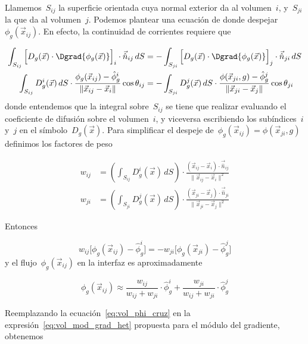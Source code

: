 Llamemos~$S_{ij}$ la superficie orientada cuya normal exterior da al volumen~$i$, y~$S_{ji}$ la que da al volumen~$j$. Podemos plantear una ecuación de donde despejar~$\phi_g(\vec{x}_{ij})$. En efecto, la continuidad de corrientes requiere que

\begin{align*}
 \int_{S_{ij}} \Big[ D_g(\vec{x}) \cdot \Dgrad{ \phi_g(\vec{x})} \Big]_i \cdot \vec{\hat{n}}_{ij} \, dS
&=
 - \int_{S_{ji}} \Big[ D_g(\vec{x}) \cdot \Dgrad{\phi_g(\vec{x})} \Big]_j \cdot \vec{\hat{n}}_{ji} \, dS
\\
\int_{S_{ij}} D_g^i(\vec{x}) \, dS \cdot \frac{\phi_g(\vec{x}_{ij}) - \hat{\phi}_g^i}{\| \vec{x}_{ij} - \vec{x}_i \|} \cos \theta_{ij}
&=
 - \int_{S_{ji}} D_g^j(\vec{x}) \, dS \cdot \frac{\phi(\vec{x}_{ji},g) - \hat{\phi}_g^j}{\| \vec{x}_{ji} - \vec{x}_j \|} \cos \theta_{ji}
\end{align*}
%
donde entendemos que la integral sobre~$S_{ij}$ se tiene que realizar evaluando el coeficiente de difusión sobre el volumen~$i$, y viceversa escribiendo los subíndices~$i$ y~$j$ en el símbolo~$D_g(\vec{x})$. Para simplificar el despeje de~$\phi_g(\vec{x}_{ij})=\phi(\vec{x}_{ji},g)$ definimos los factores de peso

\begin{align}
 w_{ij} &= \left( \int_{S_{ij}} D_g^i(\vec{x}) \, dS \right) \cdot \frac{(\vec{x}_{ij} - \vec{x}_i) \cdot \vec{\hat{n}}_{ij}}{\| \vec{x}_{ij} - \vec{x}_i \|^2} \label{eq:vol-peso-het-ij}
\\
 w_{ji} &= \left( \int_{S_{ji}} D_g^j(\vec{x}) \, dS \right) \cdot \frac{(\vec{x}_{ji} - \vec{x}_j) \cdot \vec{\hat{n}}_{ji}}{\| \vec{x}_{ji} - \vec{x}_j \|^2} \label{eq:vol-peso-het-ji}
\end{align}

Entonces

\begin{equation*}
 w_{ij} \Big[ \phi_g(\vec{x}_{ij}) - \hat{\phi}_g^i \Big] = -w_{ji} \Big[ \phi_g(\vec{x}_{ji}) - \hat{\phi}_g^j \Big]
\end{equation*}
%
y el flujo~$\phi_g(\vec{x}_{ij})$ en la interfaz es aproximadamente

\begin{equation}\label{eq:vol_phi_cruz}
 \phi_g(\vec{x}_{ij}) \approx \frac{w_{ij}}{w_{ij} + w_{ji}} \cdot \hat{\phi}_g^i + \frac{w_{ji}}{w_{ij} + w_{ji}} \cdot \hat{\phi}_g^j
\end{equation}

Reemplazando la ecuación~\eqref{eq:vol_phi_cruz} en la expresión~\eqref{eq:vol_mod_grad_het} propuesta para el módulo del gradiente, obtenemos

